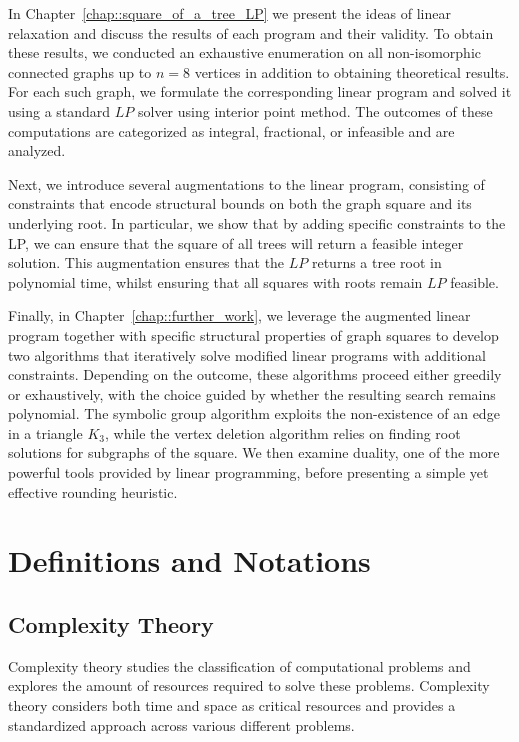 \documentclass[11pt]{report}
\begin{document}
In Chapter~\ref{chap::square_of_a_tree_LP} we present the ideas of linear relaxation and discuss the results of each program and their validity. To obtain these results, we conducted an exhaustive enumeration on all non-isomorphic connected graphs up to $n=8$ vertices in addition to obtaining theoretical results. For each such graph, we formulate the corresponding linear program and solved it using a standard $LP$ solver using interior point method. The outcomes of these computations are categorized as integral, fractional, or infeasible and are analyzed. 

Next, we introduce several augmentations to the linear program, consisting of constraints that encode structural bounds on both the graph square and its underlying root. In particular, we show that by adding specific constraints to the LP, we can ensure that the square of all trees will return a feasible integer solution. This augmentation ensures that the $LP$ returns a tree root in polynomial time, whilst ensuring that all squares with roots remain $LP$ feasible. 

Finally, in Chapter~\ref{chap::further_work}, we leverage the augmented linear program together with specific structural properties of graph squares to develop two algorithms that iteratively solve modified linear programs with additional constraints. Depending on the outcome, these algorithms proceed either greedily or exhaustively, with the choice guided by whether the resulting search remains polynomial. The symbolic group algorithm exploits the non-existence of an edge in a triangle $K_3$, while the vertex deletion algorithm relies on finding root solutions for subgraphs of the square. We then examine duality, one of the more powerful tools provided by linear programming, before presenting a simple yet effective rounding heuristic.

\section{Definitions and Notations} \label{sec::definitions_and_notations}

\subsection{Complexity Theory} \label{subsec::complexity_theory}

Complexity theory studies the classification of computational problems and explores the amount of resources required to solve these problems. Complexity theory considers both time and space as critical resources and provides a standardized approach across various different problems. 
\end{document}
